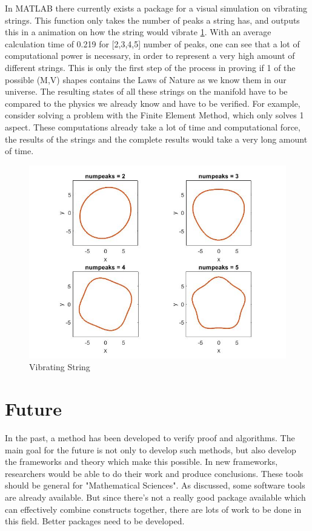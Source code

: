 \documentclass[../paper.tex]{subfiles}
\begin{document}
In MATLAB there currently exists a package for a visual simulation on vibrating strings. This function only takes the number of peaks a string has, and outputs this in a animation on how the string would vibrate \ref{Vibrating String}. With an average calculation time of 0.219 for [2,3,4,5] number of peaks, one can see that a lot of computational power is necessary, in order to represent a very high amount of different strings. This is only the first step of the process in proving if 1 of the possible (M,V) shapes contains the Laws of Nature as we know them in our universe. The resulting states of all these strings on the manifold have to be compared to the physics we already know and have to be verified. For example, consider solving a problem with the Finite Element Method, which only solves 1 aspect. These computations already take a lot of time and computational force, the results of the strings and the complete results would take a very long amount of time.

\begin{figure}[!htb]
\centering
\includegraphics[scale = 0.5]{Computational Problems/vibratingstring.jpg}
\caption{Vibrating String}
\label{Vibrating String}
\end{figure}


\section*{Future}
In the past, a method has been developed to verify proof and algorithms. The main goal for the future is not only to develop such methods, but also develop the frameworks and theory which make this possible. In new frameworks, researchers would be able to do their work and produce conclusions. These tools should be general for "Mathematical Sciences". As discussed, some software tools are already available. But since there's not a really good package available which can effectively combine constructs together, there are lots of work to be done in this field. Better packages need to be developed. 
\end{document}
